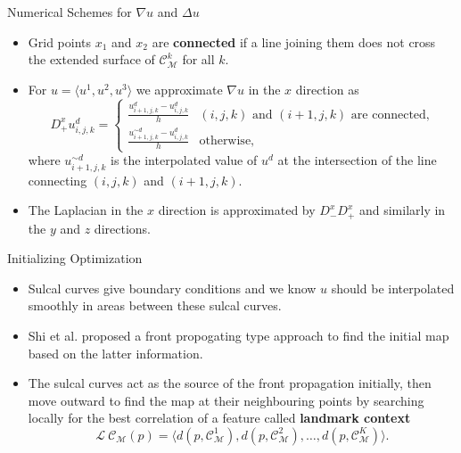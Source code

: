 \documentclass{beamer}
\begin{document}
\begin{frame}{Numerical Schemes for $\nabla u$ and $\Delta u$}
  \begin{itemize}
\item Grid points $x_1$ and $x_2$ are {\bf connected} if a line joining them does not cross the extended surface of $\mathcal{C}_{\mathcal{M}}^k$ for all $k.$
\item For $u=\langle u^1,u^2,u^3\rangle$ we approximate $\nabla u$ in the $x$ direction as
\begin{displaymath}
   D^x_+ u^d_{i,j,k}= \left\{
     \begin{array}{ll}
       \frac{u^d_{i+1,j,k}-u^d_{i,j,k}}{h} & (i,j,k) \text{ and } (i+1,j,k)\text{ are connected,}\\
       \frac{u^{\sim d}_{i+1,j,k}-u^d_{i,j,k}}{h} & \text{otherwise,}
     \end{array}
   \right.
\end{displaymath}
where $u^{\sim d}_{i+1,j,k}$ is the interpolated value of $u^d$ at the intersection of the line connecting $(i,j,k)$ and $(i+1,j,k).$
\item The Laplacian in the $x$ direction is approximated by $D^x_- D^x_+$ and similarly in the $y$ and  $z$ directions.
  \end{itemize}
\end{frame}

\begin{frame}{Initializing Optimization}
  \begin{itemize}
\item Sulcal curves give boundary conditions and we know $u$ should be interpolated smoothly in areas between these sulcal curves. %
\item Shi et al. proposed a front propogating type approach to find the initial map based on the latter information. 
\item The sulcal curves act as the source of the front propagation initially, then move outward to find the map at their neighbouring points by searching locally for the best correlation of a feature called {\bf landmark context} $$\mathcal{L}\: \mathcal{C}_{\mathcal{M}}(p) = \langle d(p,\mathcal{C}_{\mathcal{M}}^1), d(p, \mathcal{C}_{\mathcal{M}}^2), \ldots, d(p,\mathcal{C}_{\mathcal{M}}^K)\rangle.$$
  \end{itemize}
\end{frame}
\end{document}
